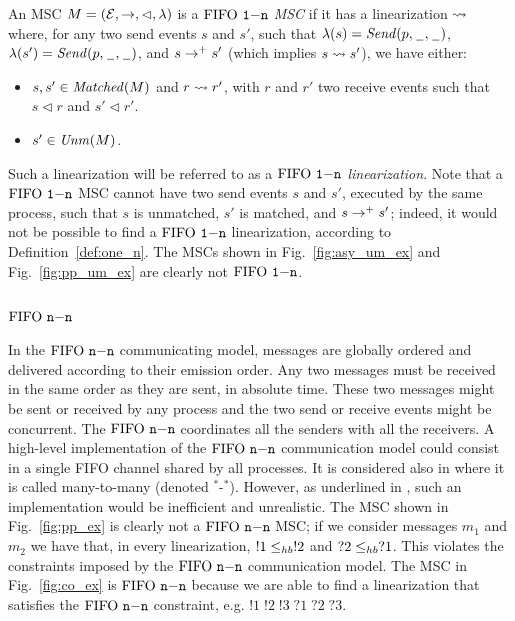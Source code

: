 \begin{definition}\label{def:one_n}
An MSC $M = (\mathcal{E},\to,\lhd,\lambda)$ is a \emph{$\text{FIFO } \mathtt{1\mathsf{-}n}$ MSC} if it has a linearization $\rightsquigarrow$ where, for any two send events $s$ and $s'$, such that $\lambda(s)={\mathit{Send}(p,\hspace{0.1em}\underline{\hspace{0.5em}}\hspace{0.1em},\hspace{0.1em}\underline{\hspace{0.5em}}\hspace{0.1em})}$, $\lambda(s')={\mathit{Send}(p,\hspace{0.1em}\underline{\hspace{0.5em}}\hspace{0.1em},\hspace{0.1em}\underline{\hspace{0.5em}}\hspace{0.1em})}$, and $s \to^+ s'$ (which implies $s \rightsquigarrow s'$), we have either:
\begin{itemize}%
	\item $s,s' \in \mathit{Matched}(M)$ and $r \rightsquigarrow r'$, with  $r$ and $r'$  two receive events such that $s \lhd r$ and $s' \lhd r'$.
	\item $s' \in \mathit{Unm}(M)$.
\end{itemize}
\end{definition}

Such a linearization will be referred to as a \emph{$\text{FIFO } \mathtt{1\mathsf{-}n}$ linearization}. Note that a $\text{FIFO } \mathtt{1\mathsf{-}n}$ MSC cannot have two send events $s$ and $s'$, executed by the same process, such that $s$ is unmatched, $s'$ is matched, and $s \to^+ s'$; indeed, it would not be possible to find a $\text{FIFO } \mathtt{1\mathsf{-}n}$ linearization, according to Definition~\ref{def:one_n}. The MSCs shown in Fig.~\ref{fig:asy_um_ex} and Fig.~\ref{fig:pp_um_ex} are clearly not $\text{FIFO } \mathtt{1\mathsf{-}n}$.


\subsection{\bf $\text{FIFO } \mathtt{n\mathsf{-}n}$}
In the $\text{FIFO } \mathtt{n\mathsf{-}n}$ communicating model, messages are globally ordered and delivered according to  their emission order. Any two messages must be received in the same order as they are sent, in absolute time. These two messages might be sent or received by any process and the two send or receive events might be concurrent.
The $\text{FIFO } \mathtt{n\mathsf{-}n}$ coordinates all the senders with all the receivers. A high-level implementation of the $\text{FIFO } \mathtt{n\mathsf{-}n}$ communication model could consist in a single FIFO channel shared by all processes. It is considered also in \cite{DBLP:journals/tcs/BasuB16} where it is called  many-to-many (denoted $^\ast$-$^\ast$). However, as underlined in \cite{DBLP:journals/fac/ChevrouHQ16}, such an implementation would be inefficient and unrealistic.
The MSC shown in Fig.~\ref{fig:pp_ex} is clearly not a $\text{FIFO } \mathtt{n\mathsf{-}n}$ MSC; if we consider messages $m_1$ and $m_2$ we have that, in every linearization, $!1 \leq_{hb} !2$ and $?2 \leq_{hb} ?1$. This violates the constraints imposed by the $\text{FIFO } \mathtt{n\mathsf{-}n}$ communication model. The MSC in Fig.~\ref{fig:co_ex} is $\text{FIFO } \mathtt{n\mathsf{-}n}$ because we are able to find a linearization that satisfies the $\text{FIFO } \mathtt{n\mathsf{-}n}$ constraint, e.g. $!1\;!2\;!3\;?1\;?2\;?3$.

